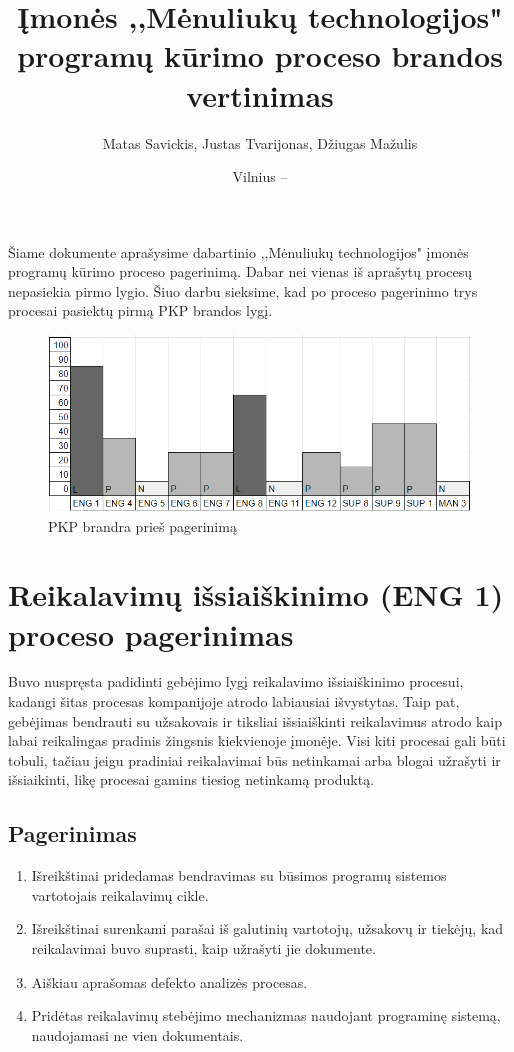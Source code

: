 \documentclass{VUMIFPSkursinis}
\title{Įmonės ,,Mėnuliukų technologijos" programų kūrimo proceso brandos vertinimas}
\author{Matas Savickis, Justas Tvarijonas, Džiugas Mažulis}
\date{Vilnius – \the\year}
\begin{document}
\maketitle

\tableofcontents

	Šiame dokumente aprašysime dabartinio ,,Mėnuliukų technologijos" įmonės programų kūrimo proceso pagerinimą. 
	Dabar nei vienas iš aprašytų procesų nepasiekia pirmo lygio.
	Šiuo darbu sieksime, kad po proceso pagerinimo trys procesai pasiektų pirmą PKP brandos lygį.
	\begin{figure}[htbp]
		\includegraphics[scale=1]{img/ProcPries}
		\caption{PKP brandra prieš pagerinimą} %
		\label{img:pkpPries}
	\end{figure}

\section{Reikalavimų išsiaiškinimo (ENG 1) proceso pagerinimas}

	Buvo nuspręsta padidinti gebėjimo lygį reikalavimo išsiaiškinimo procesui, kadangi šitas procesas kompanijoje atrodo labiausiai išvystytas.
	Taip pat, gebėjimas bendrauti su užsakovais ir tiksliai išsiaiškinti reikalavimus atrodo kaip labai reikalingas pradinis žingsnis kiekvienoje įmonėje.
	Visi kiti procesai gali būti tobuli, tačiau jeigu pradiniai reikalavimai būs netinkamai arba blogai užrašyti ir išsiaikinti, likę procesai gamins tiesiog netinkamą produktą.

\subsection{Pagerinimas}

	\begin{enumerate}
		\item{Išreikštinai pridedamas bendravimas su būsimos programų sistemos vartotojais reikalavimų cikle.}
		\item{Išreikštinai surenkami parašai iš galutinių vartotojų, užsakovų ir tiekėjų, kad reikalavimai buvo suprasti, kaip užrašyti jie dokumente.}
		\item{Aiškiau aprašomas defekto analizės procesas.}
		\item{Pridėtas reikalavimų stebėjimo mechanizmas naudojant programinę sistemą, naudojamasi ne vien dokumentais.}
	\end{enumerate}
\end{document}
